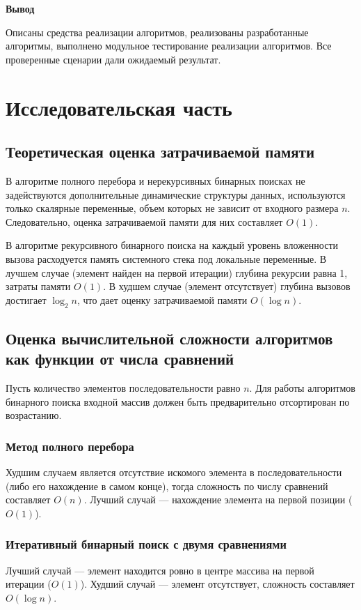 \documentclass[14pt,a4paper]{extarticle}
\newcommand{\conclusion}[1]{\par\medskip\noindent\hspace*{\parindent}\textbf{Вывод}\par\indent #1\par}
\begin{document}
\conclusion{Описаны средства реализации алгоритмов, реализованы разработанные алгоритмы, выполнено модульное тестирование реализации алгоритмов. Все проверенные сценарии дали ожидаемый результат.}

\clearpage\section{Исследовательская часть}
\label{sec:research}

\subsection{Теоретическая оценка затрачиваемой памяти}
В алгоритме полного перебора и нерекурсивных бинарных поисках не задействуются дополнительные динамические структуры данных, используются только скалярные переменные, объем которых не зависит от входного размера $n$. Следовательно, оценка затрачиваемой памяти для них составляет $O(1)$.

В алгоритме рекурсивного бинарного поиска на каждый уровень вложенности вызова расходуется память системного стека под локальные переменные. В лучшем случае (элемент найден на первой итерации) глубина рекурсии равна 1, затраты памяти $O(1)$. В худшем случае (элемент отсутствует) глубина вызовов достигает $\log_2 n$, что дает оценку затрачиваемой памяти $O(\log n)$.

\subsection{Оценка вычислительной сложности алгоритмов как функции от числа сравнений}
Пусть количество элементов последовательности равно $n$. Для работы алгоритмов бинарного поиска входной массив должен быть предварительно отсортирован по возрастанию.

\subsubsection{Метод полного перебора}
Худшим случаем является отсутствие искомого элемента в последовательности (либо его нахождение в самом конце), тогда сложность по числу сравнений составляет $O(n)$. Лучший случай — нахождение элемента на первой позиции ($O(1)$).

\subsubsection{Итеративный бинарный поиск с двумя сравнениями}
Лучший случай — элемент находится ровно в центре массива на первой итерации ($O(1)$). Худший случай — элемент отсутствует, сложность составляет $O(\log n)$.
\end{document}

